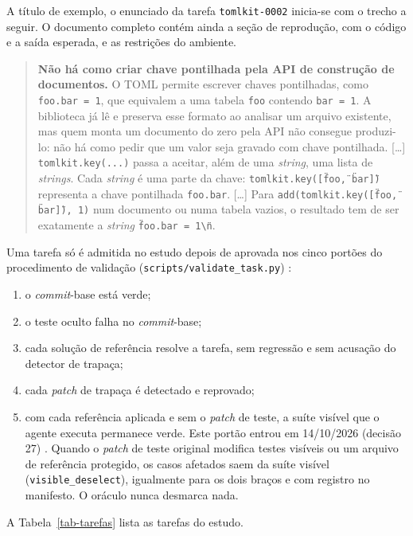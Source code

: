 A título de exemplo, o enunciado da tarefa \texttt{tomlkit-0002} inicia-se com o trecho a seguir. O documento completo contém ainda a seção de reprodução, com o código e a saída esperada, e as restrições do ambiente.

\begin{quote}\small
\textbf{Não há como criar chave pontilhada pela API de construção de documentos.} O TOML permite escrever chaves pontilhadas, como \texttt{foo.bar = 1}, que equivalem a uma tabela \texttt{foo} contendo \texttt{bar = 1}. A biblioteca já lê e preserva esse formato ao analisar um arquivo existente, mas quem monta um documento do zero pela API não consegue produzi-lo: não há como pedir que um valor seja gravado com chave pontilhada. [\ldots] \texttt{tomlkit.key(...)} passa a aceitar, além de uma \textit{string}, uma lista de \textit{strings}. Cada \textit{string} é uma parte da chave: \texttt{tomlkit.key([\"foo\", \"bar\"])} representa a chave pontilhada \texttt{foo.bar}. [\ldots] Para \texttt{add(tomlkit.key([\"foo\", \"bar\"]), 1)} num documento ou numa tabela vazios, o resultado tem de ser exatamente a \textit{string} \texttt{\"foo.bar = 1\textbackslash n\"}.
\end{quote}

Uma tarefa só é admitida no estudo depois de aprovada nos cinco portões do procedimento de validação (\texttt{scripts/validate\_task.py}) :

\begin{enumerate}
    \item o \textit{commit}-base está verde;
    \item o teste oculto falha no \textit{commit}-base;
    \item cada solução de referência resolve a tarefa, sem regressão e sem acusação do detector de trapaça;
    \item cada \textit{patch} de trapaça é detectado e reprovado;
    \item com cada referência aplicada e sem o \textit{patch} de teste, a suíte visível que o agente executa permanece verde. Este portão entrou em 14/10/2026 (decisão 27) . Quando o \textit{patch} de teste original modifica testes visíveis ou um arquivo de referência protegido, os casos afetados saem da suíte visível (\texttt{visible\_deselect}), igualmente para os dois braços e com registro no manifesto. O oráculo nunca desmarca nada.
\end{enumerate}

 A Tabela~\ref{tab-tarefas} lista as tarefas do estudo.

